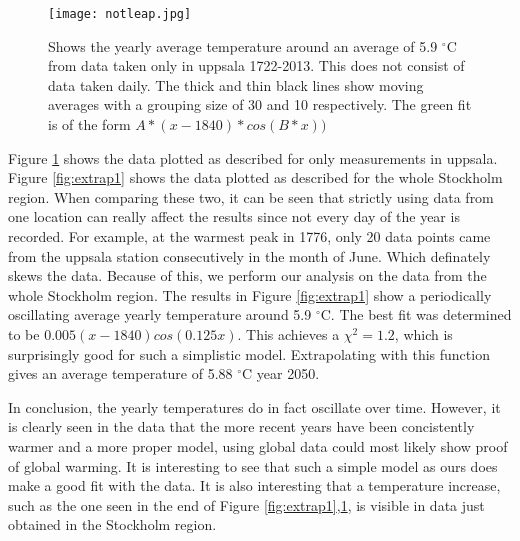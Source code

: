 \begin{figure}[h!]
\begin{center}
\texttt{[image: notleap.jpg]}
\caption{\label{fig:extrap2}Shows the yearly average temperature around an average of 5.9 $^{\circ}$C from data taken only in uppsala 1722-2013. This does not consist of data taken daily. The thick and thin black lines show moving averages with a grouping size of 30 and 10 respectively. The green fit is of the form $A*(x-1840)*cos(B*x))$}
\end{center}
\end{figure}

Figure \ref{fig:extrap2} shows the data plotted as described for only measurements in uppsala. Figure \ref{fig:extrap1} shows the data plotted as described for the whole Stockholm region. When comparing these two, it can be seen that strictly using data from one location can really affect the results since not every day of the year is recorded. For example, at the warmest peak in 1776, only 20 data points came from the uppsala station consecutively in the month of June. Which definately skews the data. Because of this, we perform our analysis on the data from the whole Stockholm region. The results in Figure \ref{fig:extrap1} show a periodically oscillating average yearly temperature around 5.9 $^{\circ}$C. The best fit was determined to be $0.005(x-1840)cos(0.125x)$. This achieves a $\chi ^2=1.2$, which is surprisingly good for such a simplistic model. Extrapolating with this function gives an average temperature of 5.88 $^{\circ}$C year 2050. 

In conclusion, the yearly temperatures do in fact oscillate over time. However, it is clearly seen in the data that the more recent years have been concistently warmer and a more proper model, using global data could most likely show proof of global warming. It is interesting to see that such a simple model as ours does make a good fit with the data. It is also interesting that a temperature increase, such as the one seen in the end of Figure \ref{fig:extrap1},\ref{fig:extrap2}, is visible in data just obtained in the Stockholm region.





